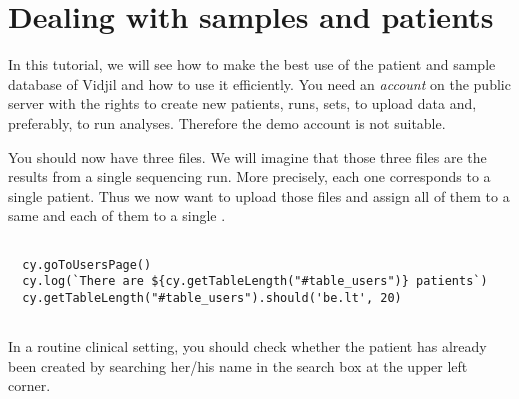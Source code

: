 \section{Dealing with samples and patients}

In this tutorial, we will see how to make 
the best use of the patient and sample database of Vidjil and
how to use it efficiently.
You need an \textit{account} on the public server with the rights to create new patients,
runs, sets, to upload data and, preferably, to run analyses.
Therefore the demo account is not suitable.




You should now have three files. We will imagine that those three files are
the results from a single sequencing run. More precisely, each one corresponds to
a single patient. Thus we now want to upload those files and assign all of
them to a same  and each of them to a single .

\begin{verbatim}

  cy.goToUsersPage()
  cy.log(`There are ${cy.getTableLength("#table_users")} patients`)
  cy.getTableLength("#table_users").should('be.lt', 20)


\end{verbatim}

In a routine clinical setting, you should check whether the patient has
already been created by searching her/his name in the search box at the
upper left corner.


